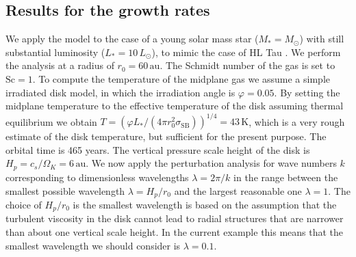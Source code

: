 \documentclass{aa}
\begin{document}
\subsection{Results for the growth rates}\label{sec-results-simple}
We apply the model to the case of a young solar mass star ($M_{*}=M_\odot$) with
still substantial luminosity ($L_{*}=10\,L_\odot$), to mimic the case of HL Tau
\citep{2015ApJ...808L...3A}. We perform the analysis at a radius of
$r_0=60\,\mathrm{au}$. The Schmidt number of the gas is set to $\mathrm{Sc}=1$.
To compute the temperature of the midplane gas we assume a simple irradiated
disk model, in which the irradiation angle is $\varphi=0.05$. By setting the
midplane temperature to the effective temperature of the disk assuming thermal
equilibrium we obtain $T=(\varphi L_{*}/(4\pi r_0^2\sigma_{\mathrm{SB}}))^{1/4}
=43\,\mathrm{K}$, which is a very rough estimate of the disk temperature, but
sufficient for the present purpose. The orbital time is 465 years. The vertical
pressure scale height of the disk is $H_p=c_s/\Omega_K=6\,\mathrm{au}$.  We now
apply the perturbation analysis for wave numbers $k$ corresponding to
dimensionless wavelengths $\lambda=2\pi/k$ in the range between the smallest
possible wavelength $\lambda=H_p/r_0$ and the largest reasonable one
$\lambda=1$. The choice of $H_p/r_0$ is the smallest wavelength is based on
the assumption that the turbulent viscosity in the disk cannot lead to
radial structures that are narrower than about one vertical scale height. In
the current example this means that the smallest wavelength we should consider
is $\lambda=0.1$.
\end{document}
